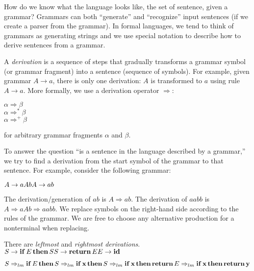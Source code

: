 \documentclass[11pt,twocolumn,nocopyright]{sigplanconf}
\begin{document}
How do we know what the language looks like, the set of sentence, given a grammar? Grammars can both ``generate'' and ``recognize'' input sentences (if we create a parser from the grammar). In formal languages, we tend to think of grammars as generating strings and we use special notation to describe how to derive sentences from a grammar.

A {\em derivation} is a sequence of steps that gradually transforms a grammar symbol (or grammar fragment) into a sentence (sequence of symbols). For example, given grammar $A \rightarrow a$, there is only one derivation: $A$ is transformed to $a$ using rule $A \rightarrow a$. More formally, we use a derivation operator $\Rightarrow$:

\noindent $\alpha \Rightarrow \beta$\\
$\alpha \Rightarrow^* \beta$\\
$\alpha \Rightarrow^+ \beta$

\noindent for arbitrary grammar fragments $\alpha$ and $\beta$.

To answer the question ``is a sentence in the language described by a grammar,'' we try to find a derivation from the start symbol of the grammar to that sentence. For example, consider the following grammar:

\noindent $
A \rightarrow a A b\\
A \rightarrow a b\\
$

The derivation/generation of $ab$ is $A \Rightarrow ab$. The derivation of $aabb$ is $A \Rightarrow aAb \Rightarrow aabb$. We replace symbols on the right-hand side according to the rules of the grammar. We are free to choose any alternative production for a nonterminal when replacing.

There are {\em leftmost} and {\em rightmost derivations}.\\
 
\noindent $
S \rightarrow {\bf if}\, E\, {\bf then}\, S\\
S \rightarrow {\bf return}\, E\\
E \rightarrow {\bf id}\\
$

\noindent $S \Rightarrow_{lm} {\bf if}\, E\, {\bf then}\, S \\
\Rightarrow_{lm} {\bf if}\, {\bf x}\, {\bf then}\, S \\
\Rightarrow_{lm} {\bf if}\, {\bf x}\, {\bf then}\, {\bf return}\, E \\
\Rightarrow_{lm} {\bf if}\, {\bf x}\, {\bf then}\, {\bf return}\, {\bf y}$
\end{document}
